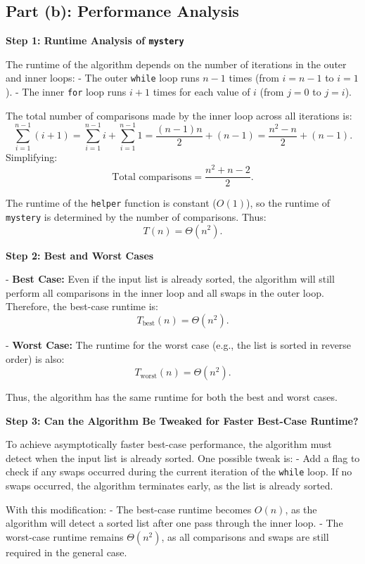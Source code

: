 \documentclass{article}
\begin{document}
\subsection*{Part (b): Performance Analysis}

\textbf{Step 1: Runtime Analysis of \texttt{mystery}}

The runtime of the algorithm depends on the number of iterations in the outer and inner loops:
- The outer \texttt{while} loop runs \( n - 1 \) times (from \( i = n - 1 \) to \( i = 1 \)).
- The inner \texttt{for} loop runs \( i + 1 \) times for each value of \( i \) (from \( j = 0 \) to \( j = i \)).

The total number of comparisons made by the inner loop across all iterations is:
\[
\sum_{i=1}^{n-1} (i + 1) = \sum_{i=1}^{n-1} i + \sum_{i=1}^{n-1} 1 = \frac{(n-1)n}{2} + (n-1) = \frac{n^2 - n}{2} + (n-1).
\]
Simplifying:
\[
\text{Total comparisons} = \frac{n^2 + n - 2}{2}.
\]

The runtime of the \texttt{helper} function is constant (\( O(1) \)), so the runtime of \texttt{mystery} is determined by the number of comparisons. Thus:
\[
T(n) = \Theta(n^2).
\]

\textbf{Step 2: Best and Worst Cases}

- \textbf{Best Case:} Even if the input list is already sorted, the algorithm will still perform all comparisons in the inner loop and all swaps in the outer loop. Therefore, the best-case runtime is:
\[
T_{\text{best}}(n) = \Theta(n^2).
\]

- \textbf{Worst Case:} The runtime for the worst case (e.g., the list is sorted in reverse order) is also:
\[
T_{\text{worst}}(n) = \Theta(n^2).
\]

Thus, the algorithm has the same runtime for both the best and worst cases.

\textbf{Step 3: Can the Algorithm Be Tweaked for Faster Best-Case Runtime?}

To achieve asymptotically faster best-case performance, the algorithm must detect when the input list is already sorted. One possible tweak is:
- Add a flag to check if any swaps occurred during the current iteration of the \texttt{while} loop. If no swaps occurred, the algorithm terminates early, as the list is already sorted.

With this modification:
- The best-case runtime becomes \( O(n) \), as the algorithm will detect a sorted list after one pass through the inner loop.
- The worst-case runtime remains \( \Theta(n^2) \), as all comparisons and swaps are still required in the general case.
\end{document}
